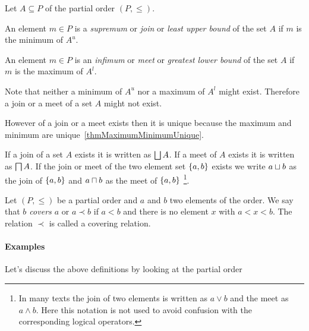\begin{definition}
    \label{defSupremumInfimum}
    Let $A \subseteq P$ of the partial order $(P, \le)$.

    An element $m \in P$ is a \emph{supremum} or \emph{join} or \emph{least
    upper bound} of the set $A$ if $m$ is the minimum of $A^u$.

    An element $m \in P$ is an \emph{infimum} or \emph{meet} or \emph{greatest
    lower bound} of the set $A$ if $m$ is the maximum of $A^l$.

    Note that neither a minimum of $A^u$ nor a maximum of $A^l$ might exist.
    Therefore a join or a meet of a set $A$ might not exist.

    However of a join or a meet exists then it is unique because the maximum and
    minimum are unique~\ref{thmMaximumMinimumUnique}.

    If a join of a set $A$ exists it is written as $\bigsqcup A$. If a meet of
    $A$ exists it is written as $\bigsqcap A$. If the join or meet of the two
    element set $\left\{a,b\right\}$ exists we write $a \sqcup b$ as the join of
    $\left\{a,b\right\}$ and $a \sqcap b$ as the meet of $\left\{a,b\right\}$
    \footnote{In many texts the join of two elements is written as $a \lor b$
    and the meet as $a \land b$. Here this notation is not used to avoid
    confusion with the corresponding logical operators.}.
\end{definition}


\begin{definition}
    \label{defCover}
    Let $(P, \le)$ be a partial order and $a$ and $b$ two elements of the order.
    We say that \emph{$b$ covers $a$} or $a \prec b$ if $a < b$ and there is no
    element $x$ with $a < x < b$. The relation $\prec$ is called a covering
    relation.
\end{definition}



\paragraph{Examples} Let's discuss the above definitions by looking at the
partial order


